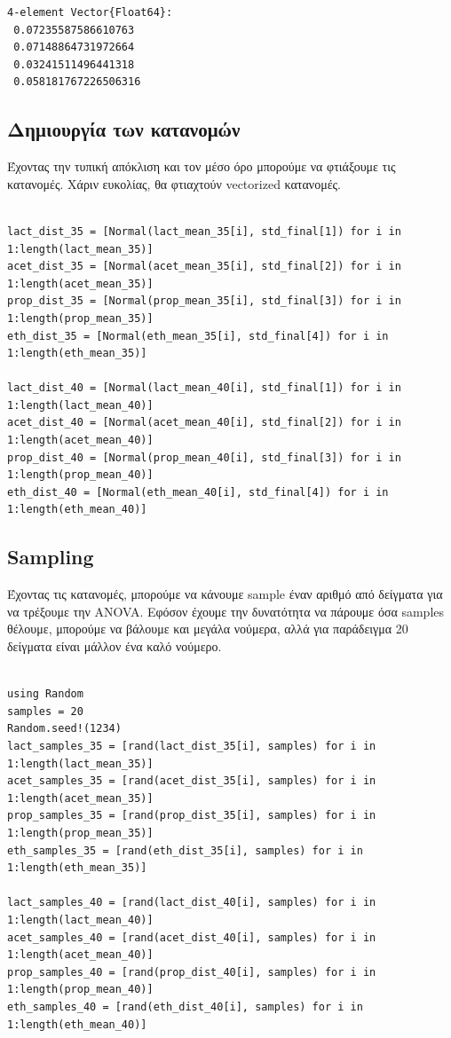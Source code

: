 \documentclass[11pt]{article}
\begin{document}
\begin{verbatim}
4-element Vector{Float64}:
 0.07235587586610763
 0.07148864731972664
 0.03241511496441318
 0.058181767226506316
\end{verbatim}

\subsection{Δημιουργία των κατανομών}
\label{sec:orge70d6d1}
Έχοντας την τυπική απόκλιση και τον μέσο όρο μπορούμε να φτιάξουμε τις κατανομές. Χάριν ευκολίας, θα φτιαχτούν vectorized κατανομές.

\begin{verbatim}

lact_dist_35 = [Normal(lact_mean_35[i], std_final[1]) for i in 1:length(lact_mean_35)]
acet_dist_35 = [Normal(acet_mean_35[i], std_final[2]) for i in 1:length(acet_mean_35)]
prop_dist_35 = [Normal(prop_mean_35[i], std_final[3]) for i in 1:length(prop_mean_35)]
eth_dist_35 = [Normal(eth_mean_35[i], std_final[4]) for i in 1:length(eth_mean_35)]

lact_dist_40 = [Normal(lact_mean_40[i], std_final[1]) for i in 1:length(lact_mean_40)]
acet_dist_40 = [Normal(acet_mean_40[i], std_final[2]) for i in 1:length(acet_mean_40)]
prop_dist_40 = [Normal(prop_mean_40[i], std_final[3]) for i in 1:length(prop_mean_40)]
eth_dist_40 = [Normal(eth_mean_40[i], std_final[4]) for i in 1:length(eth_mean_40)]

\end{verbatim}

\subsection{Sampling}
\label{sec:org7bb3984}
Έχοντας τις κατανομές, μπορούμε να κάνουμε sample έναν αριθμό από δείγματα για να τρέξουμε την ANOVA. Εφόσον έχουμε την δυνατότητα να πάρουμε όσα samples θέλουμε, μπορούμε να βάλουμε και μεγάλα νούμερα, αλλά για παράδειγμα 20 δείγματα είναι μάλλον ένα καλό νούμερο.

\begin{verbatim}

using Random
samples = 20
Random.seed!(1234)
lact_samples_35 = [rand(lact_dist_35[i], samples) for i in 1:length(lact_mean_35)]
acet_samples_35 = [rand(acet_dist_35[i], samples) for i in 1:length(acet_mean_35)]
prop_samples_35 = [rand(prop_dist_35[i], samples) for i in 1:length(prop_mean_35)]
eth_samples_35 = [rand(eth_dist_35[i], samples) for i in 1:length(eth_mean_35)]

lact_samples_40 = [rand(lact_dist_40[i], samples) for i in 1:length(lact_mean_40)]
acet_samples_40 = [rand(acet_dist_40[i], samples) for i in 1:length(acet_mean_40)]
prop_samples_40 = [rand(prop_dist_40[i], samples) for i in 1:length(prop_mean_40)]
eth_samples_40 = [rand(eth_dist_40[i], samples) for i in 1:length(eth_mean_40)]

\end{verbatim}
\end{document}

